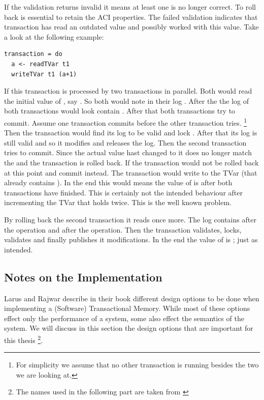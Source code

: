 If the validation returns invalid it means at least one  is no longer correct. To roll back is essential 
to retain the ACI properties. The failed validation indicates that transaction has read an outdated value and possibly worked 
with this value. Take a look at the following example:
\begin{lstlisting}
transaction = do 
  a <- readTVar t1
  writeTVar t1 (a+1)
\end{lstlisting}
If this transaction is processed by two transactions in parallel. Both would read the initial value of , say .
So both would note in their log . After the  the log of both transactions would look contain 
. After that both transactions try to commit. Assume one transaction commits before the other transaction tries.
\footnote{For simplicity we assume that no other transaction is running besides the two we are looking at.}
Then the transaction would find its log to be valid and lock . After that its log is still valid and so it modifies 
 and releases the log. 
Then the second transaction tries to commit. Since the actual value hast changed to  it does no longer match 
the  and the transaction is rolled back. If the transaction would not be rolled back at this point
and commit instead. The transaction would write  to the TVar (that already contains ). In the end 
this would means the value of  is  after both transactions have finished. This is certainly not the 
intended behaviour after incrementing the TVar that holds  twice. This is the well known 
problem. 

By rolling back the second transaction it reads  once more. The log contains  after the 
operation and  after the  operation. Then the transaction validates, locks, validates and 
finally publishes it modifications. In the end the value of  is ; just as intended.

\subsection{Notes on the Implementation}
Larus and Rajwar describe in their book\parencite[Chapter 2]{transBook} different design options to be done when implementing a 
(Software) Transactional Memory. While most of these options effect only the performance of a system, some also effect the 
semantics of the system. We will discuss in this section the design options that are important for this thesis \footnote{The names used in the 
following part are taken from \parencite[Chapter 2]{transBook}}.

